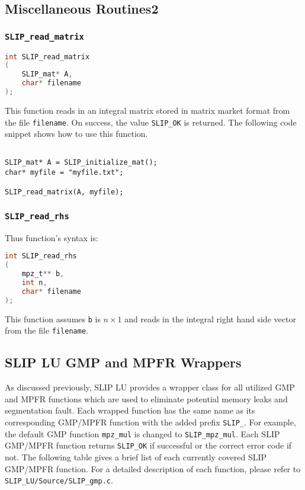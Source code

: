\documentclass[11pt]{article}
\theoremstyle{definition}
\begin{document}
\subsection{Miscellaneous Routines2}
\cprotect\subsubsection{\verb|SLIP_read_matrix|}


\begin{lstlisting}[language=C,frame=single]
int SLIP_read_matrix
(
    SLIP_mat* A,
    char* filename
);
\end{lstlisting}

This function reads in an integral matrix stored in matrix market format from the file \verb|filename|. On success, the value \verb|SLIP_OK| is returned. The following code snippet shows how to use this function.

\begin{verbatim}

SLIP_mat* A = SLIP_initialize_mat();
char* myfile = "myfile.txt";

SLIP_read_matrix(A, myfile);

\end{verbatim}

\cprotect\subsubsection{\verb|SLIP_read_rhs|}

Thus function's syntax is:

\begin{lstlisting}[language=C,frame=single]
int SLIP_read_rhs
(
    mpz_t** b,
    int n,
    char* filename
);
\end{lstlisting}

This function assumes \verb|b| is $n \times 1$ and reads in the integral right hand side vector from the file \verb|filename|.

\newpage

\subsection{SLIP LU GMP and MPFR Wrappers}

As discussed previously, SLIP LU provides a wrapper class for all utilized GMP and MPFR functions which are used to eliminate potential memory leaks and segmentation fault. Each wrapped function has the same name as its corresponding GMP/MPFR function with the added prefix \verb|SLIP_|. For example, the default GMP function \verb|mpz_mul| is changed to \verb|SLIP_mpz_mul|. Each SLIP GMP/MPFR function returns \verb|SLIP_OK| if successful or the correct error code if not. The following table gives a brief list of each currently covered SLIP GMP/MPFR function. For a detailed description of each function, please refer to \verb|SLIP_LU/Source/SLIP_gmp.c|.
\end{document}
